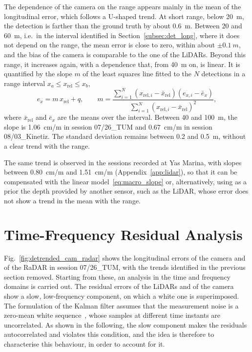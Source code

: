 The dependence of the camera on the range appears mainly in the
mean of the longitudinal error, which follows a U-shaped trend. At short range, below
\SI{20}{m}, the detection is farther than the ground truth by about \SI{0.6}{m}. Between
20 and \SI{60}{m}, i.e.\ in the interval identified in Section~\ref{subsec:det_long}, where
it does not depend on the range, the mean error is close to zero, within
about $\pm\SI{0.1}{m}$, and the bias of the camera is comparable to the one of the LiDARs. Beyond this range, it increases again, with a dependence that, from \SI{40}{m} on, is
linear. It is quantified by the slope $m$ of the least squares line fitted to the $N$
detections in a range interval $x_a \le x_{\mathrm{rel}} \le x_b$,
\begin{equation}
    e_x = m\,x_{\mathrm{rel}} + q,
    \qquad
    m = \frac{\sum_{i=1}^{N}\left(x_{\mathrm{rel},i} - \bar{x}_{\mathrm{rel}}\right)
    \left(e_{x,i} - \bar{e}_x\right)}
    {\sum_{i=1}^{N}\left(x_{\mathrm{rel},i} - \bar{x}_{\mathrm{rel}}\right)^2},
    \label{eq:macro_slope}
\end{equation}
where $\bar{x}_{\mathrm{rel}}$ and $\bar{e}_x$ are the means over the interval. Between 40
and \SI{100}{m}, the slope is \SI{1.06}{cm/m} in session 07/26\_TUM and
\SI{0.67}{cm/m} in session 08/03\_Kinetiz. The standard deviation
remains between 0.2 and \SI{0.5}{m}, without a clear trend with the range.

The same trend is observed in the sessions recorded at Yas Marina, with slopes
between \SI{0.80}{cm/m} and \SI{1.51}{cm/m} (Appendix~\ref{app:lidar}), so that it can be
compensated with the linear model~\eqref{eq:macro_slope} or, alternatively, using as a prior the depth provided by another sensor, such as the LiDAR, whose error does not show a trend in the mean with the range.

\FloatBarrier

\section{Time-Frequency Residual Analysis}
\label{sec:gauss_markov}

Fig.~\ref{fig:detrended_cam_radar} shows the longitudinal errors of the camera and of the
RaDAR in session 07/26\_TUM, with the trends identified in the previous section removed.
Starting from these, an analysis in the time and frequency domains is carried out. The
residual errors of the LiDARs and of the camera show a slow, low-frequency component, on
which a white one is superimposed. The formulation of the Kalman filter assumes that the measurement
noise is a zero-mean white sequence~\cite{kalman1960}, whose samples at different time instants are
uncorrelated. As shown in the following, the slow component makes the residuals
autocorrelated and violates this condition, and the idea is therefore to characterise this
behaviour, in order to account for it.

